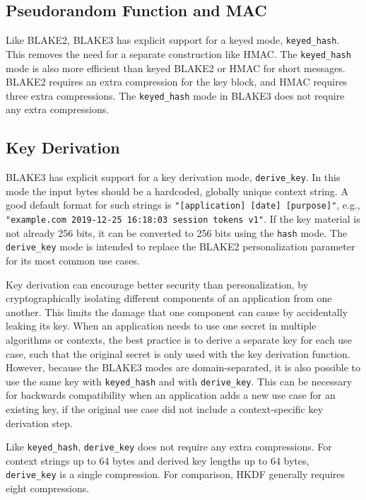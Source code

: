 \documentclass[11pt,notitlepage,a4paper]{article}
\begin{document}
\subsection{Pseudorandom Function and MAC}\label{sec:mac}

Like BLAKE2, BLAKE3 has explicit support for a keyed mode,
\texttt{keyed\_hash}. This removes the need for a separate construction like
HMAC. The \texttt{keyed\_hash} mode is also more efficient than keyed BLAKE2 or
HMAC for short messages. BLAKE2 requires an extra compression for the key
block, and HMAC requires three extra compressions. The \texttt{keyed\_hash}
mode in BLAKE3 does not require any extra compressions.

\subsection{Key Derivation}\label{sec:kdf}

BLAKE3 has explicit support for a key derivation mode, \texttt{derive\_key}. In
this mode the input bytes should be a hardcoded, globally unique context
string. A good default format for such strings is \texttt{"[application] [date]
[purpose]"}, e.g., \texttt{"example.com 2019-12-25 16:18:03 session tokens
v1"}. If the key material is not already 256 bits, it can be converted to 256
bits using the \texttt{hash} mode. The \texttt{derive\_key} mode is intended to
replace the BLAKE2 personalization parameter for its most common use cases.

Key derivation can encourage better security than personalization, by
cryptographically isolating different components of an application from one
another. This limits the damage that one component can cause by accidentally
leaking its key. When an application needs to use one secret in multiple
algorithms or contexts, the best practice is to derive a separate key for each
use case, such that the original secret is only used with the key derivation
function. However, because the BLAKE3 modes are domain-separated, it is also
possible to use the same key with \texttt{keyed\_hash} and with
\texttt{derive\_key}. This can be necessary for backwards compatibility when an
application adds a new use case for an existing key, if the original use case
did not include a context-specific key derivation step.

Like \texttt{keyed\_hash}, \texttt{derive\_key} does not require any extra
compressions. For context strings up to 64 bytes and derived key lengths up to
64 bytes, \texttt{derive\_key} is a single compression. For comparison, HKDF
generally requires eight compressions.
\end{document}
